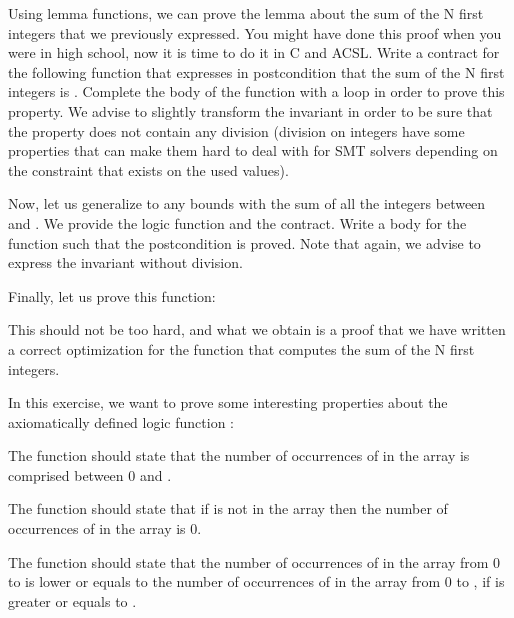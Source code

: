 Using lemma functions, we can prove the lemma about the sum of the N first
integers that we previously expressed. You might have done this proof when you
were in high school, now it is time to do it in C and ACSL. Write a contract for
the following function that expresses in postcondition that the sum of the N
first integers is . Complete the body of the function with
a loop in order to prove this property. We advise to slightly transform the
invariant in order to be sure that the property does not contain any division
(division on integers have some properties that can make them hard to deal with
for SMT solvers depending on the constraint that exists on the used values).




Now, let us generalize to any bounds with the sum of all the integers between
 and . We provide the logic function and the
contract. Write a body for the function such that the postcondition is proved.
Note that again, we advise to express the invariant without division.




Finally, let us prove this function:




This should not be too hard, and what we obtain is a proof that we have written
a correct optimization for the function that computes the sum of the N first
integers.




In this exercise, we want to prove some interesting properties about the
axiomatically defined logic function :




The function  should state that the number of
occurrences of  in the array is comprised between 0 and
.


The function  should state that if  is
not in the array then the number of occurrences of  in the array
is 0.


The function  should state that the number of
occurrences of  in the array from 0 to  is lower
or equals to the number of occurrences of  in the array from 0
to , if  is greater or equals to
.



